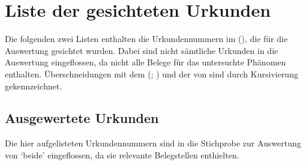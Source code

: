 \chapter{Liste der gesichteten Urkunden}
\label{sec:urkliste}

Die folgenden zwei Listen enthalten die Urkundennummern im  (\CAO), die für die Auswertung gesichtet wurden.
Dabei sind nicht sämtliche Urkunden in die Auswertung eingeflossen, da nicht
alle Belege für das untersuchte Phänomen enthalten. Überschneidungen mit dem
 (\REM; \nosh\cite{rem}) und der
 von \citet{ksw3,ksw2} sind durch
Kursivierung gekennzeichnet.

\section{Ausgewertete Urkunden}
\label{subsec:ausgewurk}

Die hier aufgelisteten Urkundennummern sind in die Stichprobe zur Auswertung von
 `beide' eingeflossen, da sie relevante Belegstellen enthielten.

